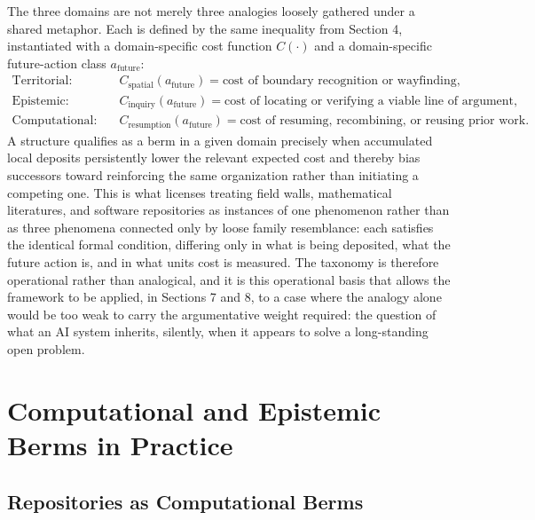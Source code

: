 \documentclass[11pt]{article}
\begin{document}
The three domains are not merely three analogies loosely gathered under a shared metaphor. Each is defined by the same inequality from Section 4, instantiated with a domain-specific cost function $C(\cdot)$ and a domain-specific future-action class $a_{\mathrm{future}}$:
\[
\begin{aligned}
\text{Territorial:} \quad & C_{\text{spatial}}(a_{\mathrm{future}}) = \text{cost of boundary recognition or wayfinding}, \\
\text{Epistemic:} \quad & C_{\text{inquiry}}(a_{\mathrm{future}}) = \text{cost of locating or verifying a viable line of argument}, \\
\text{Computational:} \quad & C_{\text{resumption}}(a_{\mathrm{future}}) = \text{cost of resuming, recombining, or reusing prior work}.
\end{aligned}
\]
A structure qualifies as a berm in a given domain precisely when accumulated local deposits persistently lower the relevant expected cost and thereby bias successors toward reinforcing the same organization rather than initiating a competing one. This is what licenses treating field walls, mathematical literatures, and software repositories as instances of one phenomenon rather than as three phenomena connected only by loose family resemblance: each satisfies the identical formal condition, differing only in what is being deposited, what the future action is, and in what units cost is measured. The taxonomy is therefore operational rather than analogical, and it is this operational basis that allows the framework to be applied, in Sections 7 and 8, to a case where the analogy alone would be too weak to carry the argumentative weight required: the question of what an AI system inherits, silently, when it appears to solve a long-standing open problem.

\section{Computational and Epistemic Berms in Practice}

\subsection{Repositories as Computational Berms}
\end{document}

